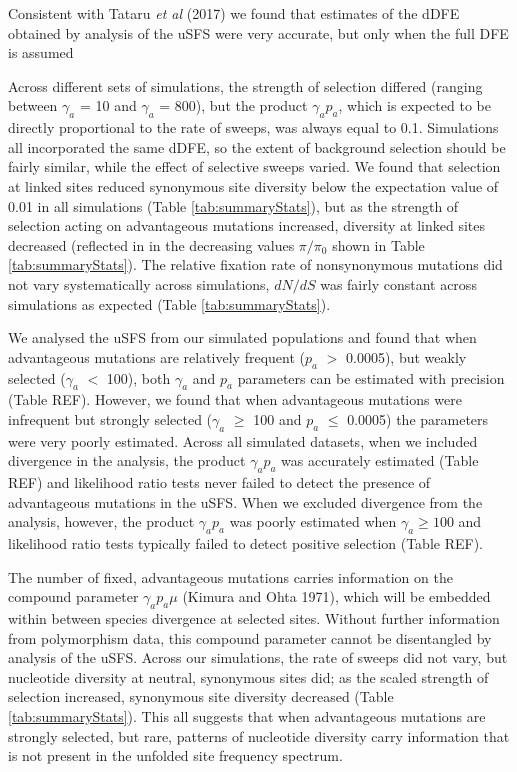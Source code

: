 \documentclass[11pt]{article}
\begin{document}
Consistent with Tataru \textit{et al} (2017) we found that estimates of the dDFE obtained by analysis of the uSFS were very accurate, but only when the full DFE is assumed 

	Across different sets of simulations, the strength of selection differed (ranging between $\gamma_a$ = 10 and $\gamma_a$ = 800), but the product $\gamma_a p_a$, which is expected to be directly proportional to the rate of sweeps, was always equal to 0.1. Simulations all incorporated the same dDFE, so the extent of background selection should be fairly similar, while the effect of selective sweeps varied. We found that selection at linked sites reduced synonymous site diversity below the expectation value of 0.01 in all simulations (Table \ref{tab:summaryStats}),  but as the strength of selection acting on advantageous mutations increased, diversity at linked sites decreased (reflected in in the decreasing values $\pi/\pi_0$ shown in Table \ref{tab:summaryStats}). The relative fixation rate of nonsynonymous mutations did not vary systematically across simulations, $dN/dS$ was fairly constant across simulations as expected (Table  \ref{tab:summaryStats}). 
	
	 We analysed the uSFS from our simulated populations and found that when advantageous mutations are relatively frequent ($p_a$ $>$ 0.0005), but weakly selected ($\gamma_a$ $<$ 100), both $\gamma_a$ and $p_a$ parameters can be estimated with precision (Table REF). However, we found that when advantageous mutations were infrequent but strongly selected ($\gamma_a$ $\geq$ 100 and $p_a$ $\leq$ 0.0005) the parameters were very poorly estimated. Across all simulated datasets, when we included divergence in the analysis, the product $\gamma_a p_a$ was accurately estimated (Table REF) and likelihood ratio tests never failed to detect the presence of advantageous mutations in the uSFS. When we excluded divergence from the analysis, however, the product  $\gamma_a p_a$  was poorly estimated when $\gamma_a \geq 100$ and likelihood ratio tests typically failed to detect positive selection (Table REF).
	
	The number of fixed, advantageous mutations carries information on the compound parameter $\gamma_a p_a \mu$ (Kimura and Ohta 1971), which will be embedded within between species divergence at selected sites. Without further information from polymorphism data, this compound parameter cannot be disentangled by analysis of the uSFS. Across our simulations, the rate of sweeps did not vary, but nucleotide diversity at neutral, synonymous sites did; as the scaled strength of selection increased, synonymous site diversity decreased (Table \ref{tab:summaryStats}). This all suggests that when advantageous mutations are strongly selected, but rare, patterns of nucleotide diversity carry information that is not present in the unfolded site frequency spectrum.
\end{document}
